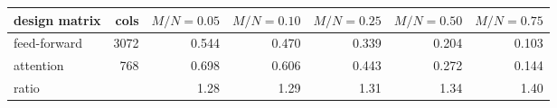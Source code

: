 \begin{tabular}{lrrrrrr}
\toprule
design matrix & cols & $M/N\!=\!0.05$ & $M/N\!=\!0.10$ & $M/N\!=\!0.25$ & $M/N\!=\!0.50$ & $M/N\!=\!0.75$\\
\midrule
feed-forward & 3072 & 0.544 & 0.470 & 0.339 & 0.204 & 0.103\\
attention & 768 & 0.698 & 0.606 & 0.443 & 0.272 & 0.144\\
\midrule
ratio & & 1.28 & 1.29 & 1.31 & 1.34 & 1.40\\
\bottomrule
\end{tabular}
